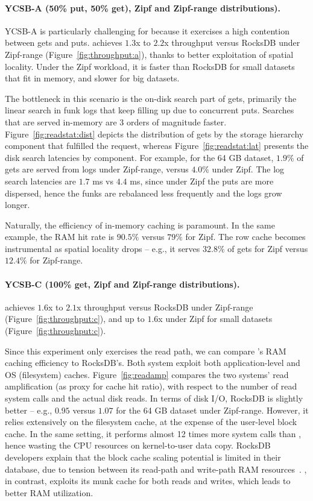 \paragraph{YCSB-A (50\% put, 50\% get), Zipf and Zipf-range distributions).}
YCSB-A  is particularly challenging for \sys\/ because it exercises a high contention between gets and puts. 
\sys\/ achieves $1.3$x to $2.2$x throughput versus RocksDB under Zipf-range (Figure~\ref{fig:throughput:a}), 
thanks to better exploitation of spatial locality. Under the Zipf workload, it is faster than RocksDB for small
datasets that fit in memory, and slower for big datasets.  

The bottleneck in this scenario is the on-disk search part of gets, primarily the linear search in funk logs 
that keep filling up due to concurrent puts. Searches that are served in-memory are 3 orders of magnitude 
faster. Figure~\ref{fig:readstat:dist} depicts the distribution of gets by the storage hierarchy component 
that fulfilled the request, whereas Figure~\ref{fig:readstat:lat} presents the disk search latencies by component. 
For example, for the 64 GB dataset, $1.9\%$ of gets are served from logs under Zipf-range, versus $4.0\%$ under Zipf. 
The log search latencies are $1.7$ ms vs $4.4$ ms, since under Zipf the puts are more dispersed, hence the funks are rebalanced less frequently and the logs grow longer. 


Naturally, the efficiency of in-memory caching is paramount. In the same example, the RAM hit rate is 
$90.5\%$ versus $79\%$ for Zipf. The row cache becomes instrumental as spatial locality drops --
e.g., it serves $32.8\%$ of gets for Zipf versus $12.4\%$ for Zipf-range. 

\paragraph{YCSB-C (100\% get, Zipf and Zipf-range distributions).}  
\sys\/ achieves $1.6$x to $2.1$x throughput versus RocksDB under Zipf-range (Figure~\ref{fig:throughput:c}),
and up to $1.6$x under Zipf for small datasets (Figure~\ref{fig:throughput:c}).   

Since this experiment only exercises the read path, we can compare \sys's RAM caching 
efficiency to RocksDB's. Both system exploit both application-level and OS (filesystem) caches. 
Figure~\ref{fig:readamp} compares the two systems' read amplification (as proxy for cache hit ratio), 
with respect to the number of read system calls and the actual disk reads.  In terms of disk I/O, RocksDB 
is slightly better -- e.g., $0.95$ versus $1.07$ for the 64 GB dataset under Zipf-range. However, it 
relies extensively on the filesystem cache, at the expense of the user-level block cache. In the same
setting, it performs almost 12 times more system calls than \sys, hence wasting the CPU resources on  
kernel-to-user data copy. RocksDB developers explain that the block cache scaling potential is limited in their
database, due to tension between its read-path and write-path RAM resources~\cite{RocksDB-default-blockcache-issue}. 
\sys, in contrast, exploits its munk cache for both reads and writes, which leads to better RAM utilization. 

